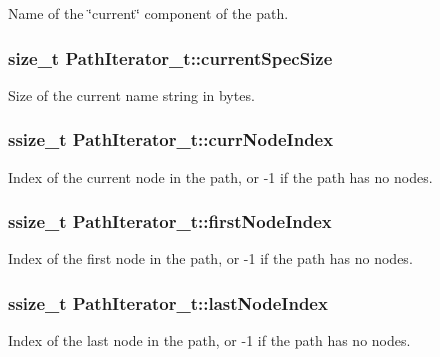 Name of the \char`\"{}current\char`\"{} component of the path. 

\subsubsection[{\texorpdfstring{current\+Spec\+Size}{currentSpecSize}}]{\setlength{\rightskip}{0pt plus 5cm}size\+\_\+t Path\+Iterator\+\_\+t\+::current\+Spec\+Size}\hypertarget{struct_path_iterator__t_a8a377599f53a007242e8ce9a95568a1e}{}\label{struct_path_iterator__t_a8a377599f53a007242e8ce9a95568a1e}


Size of the current name string in bytes. 

\subsubsection[{\texorpdfstring{curr\+Node\+Index}{currNodeIndex}}]{\setlength{\rightskip}{0pt plus 5cm}ssize\+\_\+t Path\+Iterator\+\_\+t\+::curr\+Node\+Index}\hypertarget{struct_path_iterator__t_ae58f342c3f72cb0a695e05fc7c3a42d7}{}\label{struct_path_iterator__t_ae58f342c3f72cb0a695e05fc7c3a42d7}
Index of the current node in the path, or -\/1 if the path has no nodes. 
\subsubsection[{\texorpdfstring{first\+Node\+Index}{firstNodeIndex}}]{\setlength{\rightskip}{0pt plus 5cm}ssize\+\_\+t Path\+Iterator\+\_\+t\+::first\+Node\+Index}\hypertarget{struct_path_iterator__t_a4a980497d340500884ab5e45bdc005ed}{}\label{struct_path_iterator__t_a4a980497d340500884ab5e45bdc005ed}
Index of the first node in the path, or -\/1 if the path has no nodes. 
\subsubsection[{\texorpdfstring{last\+Node\+Index}{lastNodeIndex}}]{\setlength{\rightskip}{0pt plus 5cm}ssize\+\_\+t Path\+Iterator\+\_\+t\+::last\+Node\+Index}\hypertarget{struct_path_iterator__t_a0a386d7b07d128720b0f131c0f39707d}{}\label{struct_path_iterator__t_a0a386d7b07d128720b0f131c0f39707d}
Index of the last node in the path, or -\/1 if the path has no nodes. 
